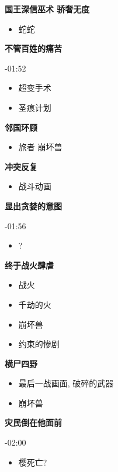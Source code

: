 \documentclass[a4paper]{article}
\begin{document}
\textbf{国王深信巫术 骄奢无度}

\begin{itemize}
    \item 蛇蛇
\end{itemize}

\textbf{不管百姓的痛苦}

-01:52

\begin{itemize}
    \item 超变手术
    \item 圣痕计划
\end{itemize}

\textbf{邻国环顾}

\begin{itemize}
    \item 旅者 崩坏兽
\end{itemize}

\textbf{冲突反复}

\begin{itemize}
    \item 战斗动画
\end{itemize}

\textbf{显出贪婪的意图}

-01:56

\begin{itemize}
    \item ?
\end{itemize}

\textbf{终于战火肆虐}

\begin{itemize}
    \item 战火
    \item 千劫的火
    \item 崩坏兽
    \item 约束的惨剧
\end{itemize}

\textbf{横尸四野}

\begin{itemize}
    \item 最后一战画面, 破碎的武器
    \item 崩坏兽
\end{itemize}

\textbf{灾民倒在他面前}

-02:00

\begin{itemize}
    \item 樱死亡?
\end{itemize}
\end{document}
